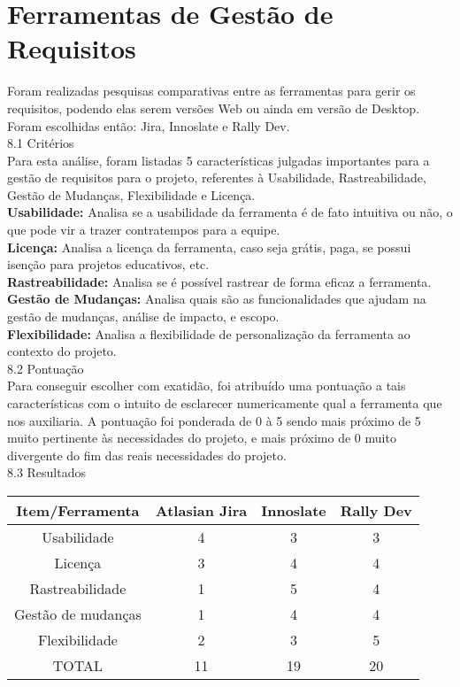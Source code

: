 \section{Ferramentas de Gestão de Requisitos}
\label{sec}
\tab Foram realizadas pesquisas comparativas entre as ferramentas para gerir os requisitos, podendo elas serem versões Web ou ainda em versão de Desktop. Foram escolhidas então: Jira, Innoslate e Rally Dev.\\

{\large{8.1 Critérios}}\\

\tab Para esta análise, foram listadas 5 características julgadas importantes para a gestão de requisitos para o projeto, referentes à Usabilidade, Rastreabilidade, Gestão de Mudanças, Flexibilidade e Licença.\\
\tab \textbf{Usabilidade:} Analisa se a usabilidade da ferramenta é de fato intuitiva ou não, o que pode vir a trazer contratempos para a equipe.\\
\tab \textbf{Licença:} Analisa a licença da ferramenta, caso seja grátis, paga, se possui isenção para projetos educativos, etc.\\
\tab \textbf{Rastreabilidade:} Analisa se é possível rastrear de forma eficaz a ferramenta.\\
\tab \textbf{Gestão de Mudanças:} Analisa quais são as funcionalidades que ajudam na gestão de mudanças, análise de impacto, e escopo.\\
\tab \textbf{Flexibilidade:} Analisa a flexibilidade de personalização da ferramenta ao contexto do projeto.\\

{\large{8.2 Pontuação}}\\

\tab Para conseguir escolher com exatidão, foi atribuído uma pontuação a tais características com o intuito de esclarecer numericamente qual a ferramenta que nos auxiliaria. A pontuação foi ponderada de 0 à 5 sendo mais próximo de 5 muito pertinente às necessidades do projeto, e mais próximo de 0 muito divergente do fim das reais necessidades do projeto.\\

{\large{8.3 Resultados}}\\

\begin{tabular}{| c | c | c | c |} \hline
Item/Ferramenta & Atlasian Jira  & Innoslate & Rally Dev \\ \hline
Usabilidade & 4 & 3 & 3 \\
Licença & 3 & 4 & 4 \\
Rastreabilidade & 1 & 5 & 4 \\
Gestão de mudanças & 1 & 4 & 4 \\
Flexibilidade & 2 & 3 & 5  \\ \hline
TOTAL & 11 & 19 & 20 \\ \hline

\end{tabular} \\

